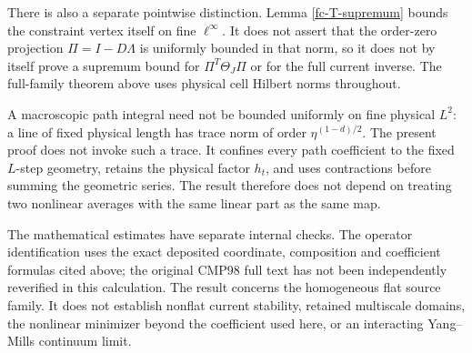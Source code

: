\documentclass[11pt]{article}
\theoremstyle{remark}\newtheorem{remark}[theorem]{Remark}
\begin{document}
There is also a separate pointwise distinction. Lemma
\ref{fc-T-supremum} bounds the constraint vertex itself on fine
$\ell^\infty$. It does not assert that the order-zero projection
$\Pi=I-D\Lambda$ is uniformly bounded in that norm, so it does not
by itself prove a supremum bound for $\Pi^T\Theta_J\Pi$ or for the
full current inverse. The full-family theorem above uses physical
cell Hilbert norms throughout.

A macroscopic path integral need not be bounded uniformly on fine
physical $L^2$: a line of fixed physical length has trace norm of
order $\eta^{(1-d)/2}$. The present proof does not invoke such a
trace. It confines every path coefficient to the fixed $L$-step
geometry, retains the physical factor $h_t$, and uses contractions
before summing the geometric series. The result therefore does not
depend on treating two nonlinear averages with the same linear
part as the same map.

The mathematical estimates have separate internal checks. The
operator identification uses the exact deposited coordinate,
composition and coefficient formulas cited above; the original
CMP98 full text has not been independently reverified in this
calculation. The result concerns the homogeneous flat source
family. It does not establish nonflat current stability, retained
multiscale domains, the nonlinear minimizer beyond the coefficient
used here, or an interacting Yang--Mills continuum limit.
\end{document}
